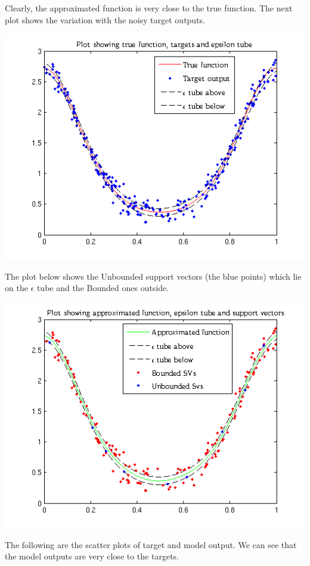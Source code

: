 \documentclass{article}
\begin{document}
Clearly, the approximated function is very close to the true function. The next plot shows the variation with the noisy target outputs.
\begin{center}
\includegraphics[scale=0.7]{Regression/Plot_2}
\end{center}
The plot below shows the Unbounded support vectors (the blue points) which lie on the $\epsilon$ tube and the Bounded ones outside.
\begin{center}
\includegraphics[scale=1]{Regression/Plot_3}
\end{center}
The following are the scatter plots of target and model output. We can see that the model outputs are very close to the targets. 
\end{document}
